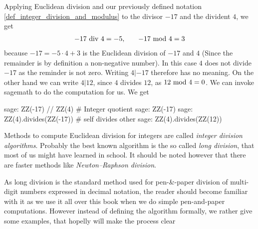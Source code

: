 \begin{example} Applying Euclidean division and our previously defined notation \ref{def_integer_division_and_modulus} to the divisor $-17$ and the divident $4$, we get 
\begin{equation*}
\begin{array}{lcr}
-17 \text{ div } 4 = - 5, & & -17 \text{ mod } 4 = 3
\end{array}
\end{equation*}
because $ -17 = -5 \cdot 4 + 3 $  is the Euclidean division of $-17$ and $4$ (Since the remainder is by definition a non-negative number). In this case $4$ does not divide $-17$ as the reminder is not zero. Writing $4 | -17 $ therefore has no meaning. On the other hand we can write $4 | 12$, since $4$ divides $12$, as $ 12 \text{ mod } 4 = 0 $. We can invoke sagemath to do the computation for us. We get
\begin{sagecommandline}
sage: ZZ(-17) // ZZ(4) # Integer quotient 
sage: ZZ(-17) %
sage: ZZ(4).divides(ZZ(-17)) # self divides other
sage: ZZ(4).divides(ZZ(12))
\end{sagecommandline}
\end{example}
Methods to compute Euclidean division for integers are called \textit{integer division algorithms}. Probably the best known algorithm is the so called \textit{long division}, that most of us might have learned in school. It should be noted however that there are faster methods like \textit{Newton–Raphson division}.

As long division is the standard method used for pen-\&-paper division of multi-digit numbers expressed in decimal notation, the reader should become familiar with it as we use it all over this book when we do simple pen-and-paper computations. However instead of defining the algorithm formally, we rather give some examples, that hopelly will make the process clear

